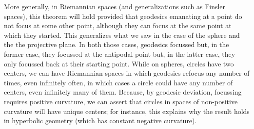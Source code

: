 \documentclass[12pt]{article}
\begin{document}
More generally, in Riemannian spaces (and generalizations such as Finsler spaces), this theorem will hold provided that geodesics emanating at a point do not focus at some other point, although they can focus at the same point at which they started.  This generalizes what we saw in the case of the sphere and the the projective plane.  In both those cases, geodesics focussed but, in the former case, they focussed at the antipodal point but, in the latter case, they only focussed back at their starting point.  While on spheres, circles have two centers, we can have Riemannian spaces in which geodesics refocus any number of times, even infinitely often, in which cases a circle could have any number of centers, even infinitely many of them.  Because, by geodesic deviation, focussing requires positive curvature, we can assert that circles in spaces of non-positive curvature will have unique centers; for instance, this explains why the result holds in hyperbolic geometry (which has constant negative curvature).
\end{document}
